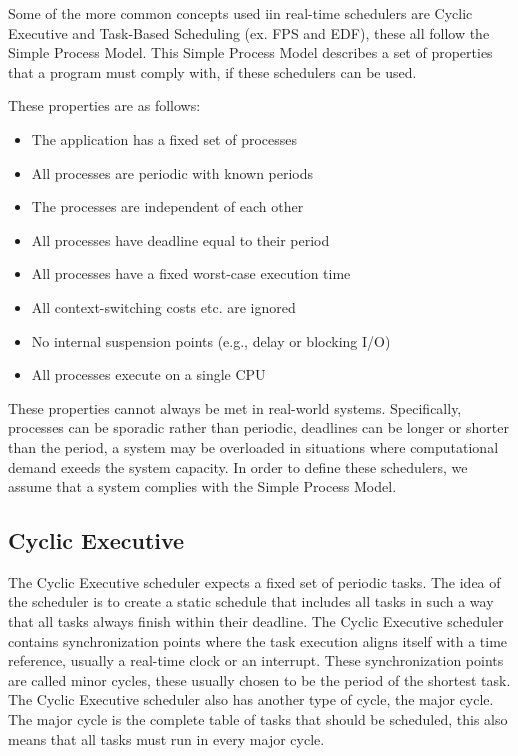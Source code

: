 Some of the more common concepts used iin real-time schedulers are Cyclic Executive and Task-Based Scheduling (ex. FPS and EDF), these all follow the Simple Process Model. This Simple Process Model describes a set of properties that a program must comply with, if these  schedulers can be used.

These properties are as follows\cite{simpleprocessmodel-slides}:

\begin{itemize}
\item The application has a fixed set of processes
\item All processes are periodic with known periods
\item The processes are independent of each other
\item All processes have deadline equal to their period
\item All processes have a fixed worst-case execution time
\item All context-switching costs etc. are ignored
\item No internal suspension points (e.g., delay or blocking I/O)
\item All processes execute on a single CPU
\end{itemize}

These properties cannot always be met in real-world systems. Specifically, processes can be sporadic rather than periodic, deadlines can be longer or shorter than the period, a system may be overloaded in situations where computational demand exeeds the system capacity. In order to define these schedulers, we assume that a system complies with the Simple Process Model.

\subsection{Cyclic Executive}
The Cyclic Executive scheduler expects a fixed set of periodic tasks. The idea of the scheduler is to create a static schedule that includes all tasks in such a way that all tasks always finish within their deadline. The Cyclic Executive scheduler contains synchronization points where the task execution aligns itself with a time reference, usually a real-time clock or an interrupt. These synchronization points are called minor cycles, these usually chosen to be the period of the shortest task. The Cyclic Executive scheduler also has another type of cycle, the major cycle. The major cycle is the complete table of tasks that should be scheduled, this also means that all tasks must run in every major cycle.


